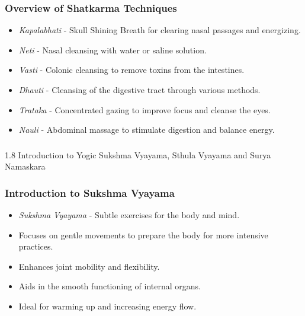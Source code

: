 \begin{frame}[fragile]\frametitle{Overview of Shatkarma Techniques}

      \begin{itemize}
		\item \textit{Kapalabhati} - Skull Shining Breath for clearing nasal passages and energizing.
		\item \textit{Neti} - Nasal cleansing with water or saline solution.
		\item \textit{Vasti} - Colonic cleansing to remove toxins from the intestines.
		\item \textit{Dhauti} - Cleansing of the digestive tract through various methods.
		\item \textit{Trataka} - Concentrated gazing to improve focus and cleanse the eyes.
		\item \textit{Nauli} - Abdominal massage to stimulate digestion and balance energy.
	  \end{itemize}

\end{frame}


\begin{frame}[fragile]\frametitle{}
\begin{center}
{\Large 1.8 Introduction to Yogic  Sukshma Vyayama,  Sthula Vyayama and Surya Namaskara}
\end{center}
\end{frame}

\begin{frame}[fragile]\frametitle{Introduction to Sukshma Vyayama}

      \begin{itemize}
		\item \textit{Sukshma Vyayama} - Subtle exercises for the body and mind.
		\item Focuses on gentle movements to prepare the body for more intensive practices.
		\item Enhances joint mobility and flexibility.
		\item Aids in the smooth functioning of internal organs.
		\item Ideal for warming up and increasing energy flow.
	  \end{itemize}

\end{frame}

